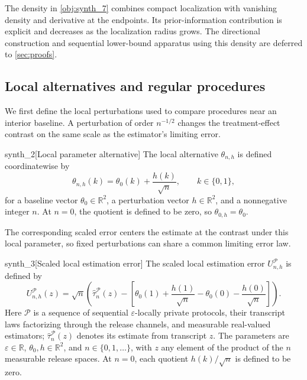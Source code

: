 The density in \cref{obj:synth_7} combines compact localization with vanishing density and derivative at the endpoints. Its prior-information contribution is explicit and decreases as the localization radius grows. The directional construction and sequential lower-bound apparatus using this density are deferred to \cref{sec:proofs}.

\subsection{Local alternatives and regular procedures}

We first define the local perturbations used to compare procedures near an interior baseline. A perturbation of order \(n^{-1/2}\) changes the treatment-effect contrast on the same scale as the estimator's limiting error.

\begin{definitionv}{synth_2}[Local parameter alternative]
The local alternative \(\theta_{n,h}\) is defined coordinatewise by
\[
\theta_{n,h}(k)=\theta_0(k)+\frac{h(k)}{\sqrt n},
\qquad k\in\{0,1\},
\]
for a baseline vector \(\theta_0\in\mathbb R^2\), a perturbation vector \(h\in\mathbb R^2\), and a nonnegative integer \(n\). At \(n=0\), the quotient is defined to be zero, so \(\theta_{0,h}=\theta_0\).
\end{definitionv}

The corresponding scaled error centers the estimate at the contrast under this local parameter, so fixed perturbations can share a common limiting error law.

\begin{definitionv}{synth_3}[Scaled local estimation error]
The scaled local estimation error \(U_{n,h}^{\mathcal P}\) is defined by
\[
U_{n,h}^{\mathcal P}(z)
=
\sqrt n\left(
\widehat\tau_n^{\mathcal P}(z)
-
\left[
\theta_0(1)+\frac{h(1)}{\sqrt n}
-\theta_0(0)-\frac{h(0)}{\sqrt n}
\right]
\right).
\]
Here \(\mathcal P\) is a sequence of sequential \(\varepsilon\)-locally private protocols, their transcript laws factorizing through the release channels, and measurable real-valued estimators; \(\widehat\tau_n^{\mathcal P}(z)\) denotes its estimate from transcript \(z\). The parameters are \(\varepsilon\in\mathbb R\), \(\theta_0,h\in\mathbb R^2\), and \(n\in\{0,1,\ldots\}\), with \(z\) any element of the product of the \(n\) measurable release spaces. At \(n=0\), each quotient \(h(k)/\sqrt n\) is defined to be zero.
\end{definitionv}

